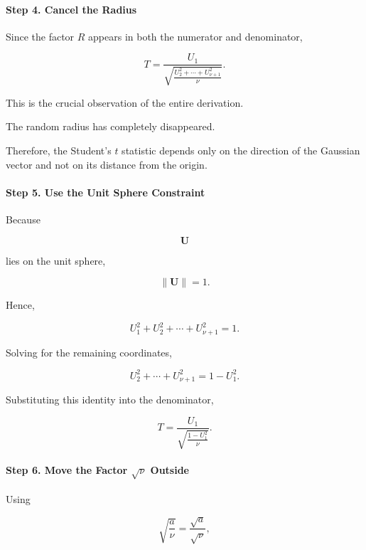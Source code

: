 \documentclass[11pt]{article}
\begin{document}
\begin{mdframed}[
		linewidth=0.8pt,
		roundcorner=6pt,
		backgroundcolor=gray!5,
		linecolor=gray!60,
		innertopmargin=10pt,
		innerbottommargin=10pt,
		innerleftmargin=10pt,
		innerrightmargin=10pt
		]
		\vspace{0.3cm}
		
		\paragraph{Step 4. Cancel the Radius}
		
		Since the factor $R$ appears in both the numerator and denominator,
		
		\[
		T
		=
		\frac{U_1}
		{
			\sqrt{
				\frac{
					U_2^2+\cdots+U_{\nu+1}^2
				}{\nu}
			}
		}.
		\]
		
		This is the crucial observation of the entire derivation.
		
		The random radius has completely disappeared.
		
		Therefore, the Student's $t$ statistic depends only on the direction of the
		Gaussian vector and not on its distance from the origin.
		
		\vspace{0.3cm}
		
		\paragraph{Step 5. Use the Unit Sphere Constraint}
		
		Because
		
		\[
		\mathbf U
		\]
		
		lies on the unit sphere,
		
		\[
		\|\mathbf U\|=1.
		\]
		
		Hence,
		
		\[
		U_1^2+U_2^2+\cdots+U_{\nu+1}^2=1.
		\]
		
		Solving for the remaining coordinates,
		
		\[
		U_2^2+\cdots+U_{\nu+1}^2
		=
		1-U_1^2.
		\]
		
		Substituting this identity into the denominator,
		
		\[
		T
		=
		\frac{U_1}
		{
			\sqrt{
				\frac{
					1-U_1^2
				}{\nu}
			}
		}.
		\]
		
		\vspace{0.3cm}
		
		\paragraph{Step 6. Move the Factor $\sqrt{\nu}$ Outside}
		
		Using
		
		\[
		\sqrt{\frac{a}{\nu}}
		=
		\frac{\sqrt a}{\sqrt\nu},
		\]
		

\end{mdframed}
\end{document}
